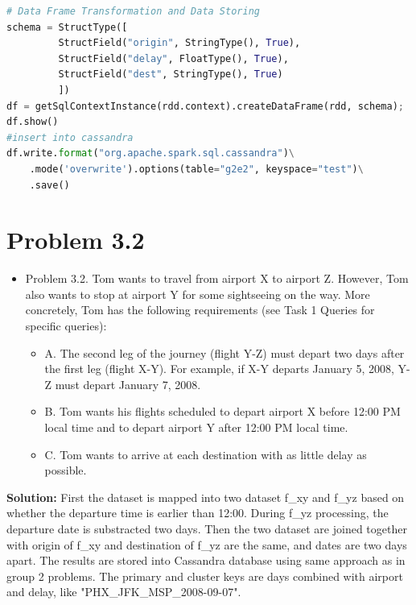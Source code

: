 \documentclass[fontsize=11pt,paper=a4]{scrartcl}
\begin{document}
\begin{lstlisting}[basicstyle=\small,language = python] 
# Data Frame Transformation and Data Storing 
schema = StructType([
         StructField("origin", StringType(), True),
         StructField("delay", FloatType(), True), 
         StructField("dest", StringType(), True)
         ])
df = getSqlContextInstance(rdd.context).createDataFrame(rdd, schema);  
df.show() 
#insert into cassandra 
df.write.format("org.apache.spark.sql.cassandra")\
    .mode('overwrite').options(table="g2e2", keyspace="test")\
    .save()
\end{lstlisting}

\section{Problem 3.2}
\begin{itemize}
\item Problem 3.2. Tom wants to travel from airport X to airport Z. However, Tom also wants to stop at airport Y for some sightseeing on the way. More concretely, Tom has the following requirements (see Task 1 Queries for specific queries):
\begin{itemize}
\item A. The second leg of the journey (flight Y-Z) must depart two days after the first leg (flight X-Y). For example, if X-Y departs January 5, 2008, Y-Z must depart January 7, 2008.
\item B. Tom wants his flights scheduled to depart airport X before 12:00 PM local time and to depart airport Y after 12:00 PM local time.
\item C. Tom wants to arrive at each destination with as little delay as possible.
\end{itemize}
\end{itemize}
\textbf{Solution:} First the dataset is mapped into two dataset f{\_}xy and f{\_}yz based on whether the departure time is earlier than 12:00. During f{\_}yz processing, the departure date is substracted two days. Then the two dataset are joined together with origin of f{\_}xy and destination of f{\_}yz are the same, and dates are two days apart. The results are stored into Cassandra database using same approach as in group 2 problems. The primary and cluster keys are days combined with airport and delay, like "PHX{\_}JFK{\_}MSP{\_}2008-09-07". 
\end{document}
